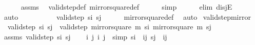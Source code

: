 \begin{isabellebody}
\ \ \ \ \isamarkupfalse%
\ assms\ \isamarkupfalse%
\ valid{\isacharunderscore}{\kern0pt}step{\isacharunderscore}{\kern0pt}def\ mirror{}{\isacharunderscore}{\kern0pt}square{\isacharunderscore}{\kern0pt}def\isanewline
\ \ \ \ \isamarkupfalse%
\ simp\isanewline
\ \ \ \ \isamarkupfalse%
\ {\isacharparenleft}{\kern0pt}elim\ disjE{\isacharparenright}{\kern0pt}\isanewline
\ \ \ \ \isamarkupfalse%
\ auto\isanewline
\ \ \ \ \isamarkupfalse%
\isanewline
\ \ \isamarkupfalse%
\ \isamarkupfalse%
\ {\isachardoublequoteopen}valid{\isacharunderscore}{\kern0pt}step\ s\isactrlsub i\ s\isactrlsub j{\isachardoublequoteclose}\isanewline
\ \ \ \ \isamarkupfalse%
\ mirror{}{\isacharunderscore}{\kern0pt}square{\isacharunderscore}{\kern0pt}def\ \isamarkupfalse%
\ auto\isanewline
{}\isamarkupfalse%
%
\endisatagproof
{\isafoldproof}%
%
\isadelimproof
\isanewline
%
\endisadelimproof
\isanewline
{}\isamarkupfalse%
\ valid{\isacharunderscore}{\kern0pt}step{\isacharunderscore}{\kern0pt}mirror{}{\isacharcolon}{\kern0pt}\ \isanewline
\ \ {\isachardoublequoteopen}valid{\isacharunderscore}{\kern0pt}step\ s\isactrlsub i\ s\isactrlsub j\ {\isasymlongleftrightarrow}\ valid{\isacharunderscore}{\kern0pt}step\ {\isacharparenleft}{\kern0pt}mirror{}{\isacharunderscore}{\kern0pt}square\ m\ s\isactrlsub i{\isacharparenright}{\kern0pt}\ {\isacharparenleft}{\kern0pt}mirror{}{\isacharunderscore}{\kern0pt}square\ m\ s\isactrlsub j{\isacharparenright}{\kern0pt}{\isachardoublequoteclose}\isanewline
%
\isadelimproof
%
\endisadelimproof
%
\isatagproof
{}\isamarkupfalse%
\isanewline
\ \ \isamarkupfalse%
\ assms{\isacharcolon}{\kern0pt}\ {\isachardoublequoteopen}valid{\isacharunderscore}{\kern0pt}step\ s\isactrlsub i\ s\isactrlsub j{\isachardoublequoteclose}\isanewline
\ \ \isamarkupfalse%
\ i\ j\ i{\isacharprime}{\kern0pt}\ j{\isacharprime}{\kern0pt}\ \ {\isacharbrackleft}{\kern0pt}simp{\isacharbrackright}{\kern0pt}{\isacharcolon}{\kern0pt}\ {\isachardoublequoteopen}s\isactrlsub i\ {\isacharequal}{\kern0pt}\ {\isacharparenleft}{\kern0pt}i{\isacharcomma}{\kern0pt}j{\isacharparenright}{\kern0pt}{\isachardoublequoteclose}\ {\isachardoublequoteopen}s\isactrlsub j\ {\isacharequal}{\kern0pt}\ {\isacharparenleft}{\kern0pt}i{\isacharprime}{\kern0pt}{\isacharcomma}{\kern0pt}j{\isacharprime}{\kern0pt}{\isacharparenright}{\kern0pt}{\isachardoublequoteclose}\ \isamarkupfalse%

\end{isabellebody}
